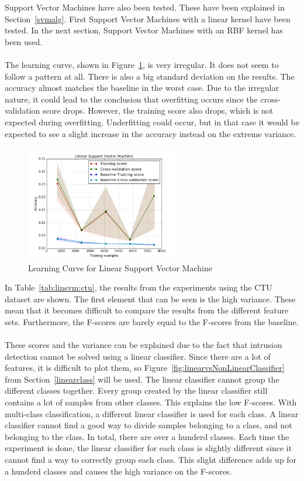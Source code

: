 Support Vector Machines have also been tested. These have been explained in Section~\ref{svmalg}. First Support Vector Machines with a linear kernel have been tested. In the next section, Support Vector Machines with an RBF kernel has been used. \\
\\
The learning curve, shown in Figure~\ref{fig:svml}, is very irregular. It does not seem to follow a pattern at all. There is also a big standard deviation on the results. The accuracy almost matches the baseline in the worst case. Due to the irregular nature, it could lead to the conclusion that overfitting occurs since the cross-validation score drops. However, the training score also drops, which is not expected during overfitting. Underfitting could occur, but in that case it would be expected to see a slight increase in the accuracy instead on the extreme variance. 

 \begin{figure}[H]
\centering
\includegraphics[width=0.6\textwidth]{Figures/Linear_Support_Vector_Machine}
\decoRule
\caption[Learning Curve for Linear Support Vector Machine]{Learning Curve for Linear Support Vector Machine}
\label{fig:svml}
\end{figure}

\noindent In Table~\ref{tab:linsvm:ctu}, the results from the experiments using the CTU dataset are shown. The first element that can be seen is the high variance. These mean that it becomes difficult to compare the results from the different feature sets. Furthermore, the F-scores are barely equal to the F-scores from the baseline. \\
\\
These scores and the variance can be explained due to the fact that intrusion detection cannot be solved using a linear classifier. Since there are a lot of features, it is difficult to plot them, so Figure~\ref{fig:linearvsNonLinearClassifier} from Section~\ref{linearclass} will be used. The linear classifier cannot group the different classes together. Every group created by the linear classifier still contains a lot of samples from other classes. This explains the low F-scores. With multi-class classification, a different linear classifier is used for each class. A linear classifier cannot find a good way to divide samples belonging to a class, and not belonging to the class. In total, there are over a hunderd classes. Each time the experiment is done, the linear classifier for each class is slightly different since it cannot find a way to correctly group each class. This slight difference adds up for a hunderd classes and causes the high variance on the F-scores. 

